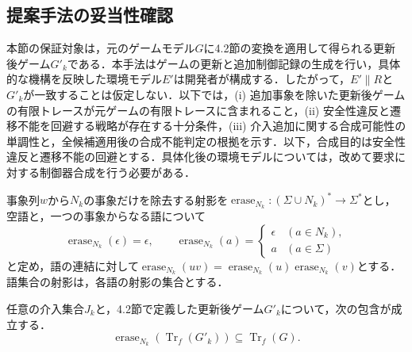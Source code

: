 \subsection{提案手法の妥当性確認}
\label{sec:proposal_validity}

本節の保証対象は，元のゲームモデル$G$に4.2節の変換を適用して得られる更新後ゲーム$G'_k$である．本手法はゲームの更新と追加制御記録の生成を行い，具体的な機構を反映した環境モデル$E'$は開発者が構成する．したがって，$E'\parallel R$と$G'_k$が一致することは仮定しない．以下では，(i) 追加事象を除いた更新後ゲームの有限トレースが元ゲームの有限トレースに含まれること，(ii) 安全性違反と遷移不能を回避する戦略が存在する十分条件，(iii) 介入追加に関する合成可能性の単調性と，全候補適用後の合成不能判定の根拠を示す．以下，合成目的は安全性違反と遷移不能の回避とする．具体化後の環境モデルについては，改めて要求に対する制御器合成を行う必要がある．

事象列$w$から$N_k$の事象だけを除去する射影を$\operatorname{erase}_{N_k}:(\Sigma\cup N_k)^*\to\Sigma^*$とし，空語と，一つの事象からなる語について
\[
\operatorname{erase}_{N_k}(\epsilon)=\epsilon,\qquad
\operatorname{erase}_{N_k}(a)=
\begin{cases}
\epsilon & (a\in N_k),\\
a & (a\in\Sigma)
\end{cases}
\]
と定め，語の連結に対して$\operatorname{erase}_{N_k}(uv)=\operatorname{erase}_{N_k}(u)\operatorname{erase}_{N_k}(v)$とする．語集合の射影は，各語の射影の集合とする．

\begin{theorem}
\label{theorem2}

任意の介入集合$J_k$と，4.2節で定義した更新後ゲーム$G'_k$について，次の包含が成立する．
\[
\operatorname{erase}_{N_k}(\operatorname{Tr}_f(G'_k))
\subseteq\operatorname{Tr}_f(G).
\]
\end{theorem}

